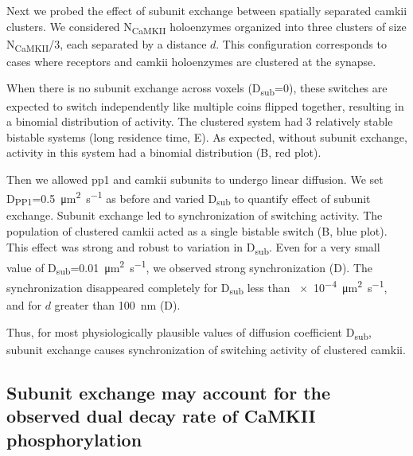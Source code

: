 \documentclass[9pt,lineno,doublespacing]{elife}
\newcommand\SUB[2]{#1\textsubscript{#2}}
\begin{document}
Next we probed the effect of subunit exchange between spatially separated
\gls{camkii} clusters. We considered \SUB{N}{CaMKII} holoenzymes organized into
three clusters of size \SUB{N}{CaMKII}/3, each separated by a distance \(d\).
This configuration corresponds to cases where receptors and \gls{camkii}
holoenzymes are clustered at the synapse. 

When there is no subunit exchange across voxels (\SUB{D}{sub}=0), these switches
are expected to switch independently like multiple coins flipped together,
resulting in a binomial distribution of activity. The clustered system had 3
relatively stable bistable systems (long residence time, E). As
expected, without subunit exchange, activity in this system had a binomial
distribution (B, red plot). 

Then we allowed \gls{pp1} and \gls{camkii} subunits to undergo linear diffusion.
We set \SUB{D}{PP1}=\SI{0.5}{\micro\meter\squared\per\second} as before and
varied \SUB{D}{sub} to quantify effect of subunit exchange. Subunit exchange led
to synchronization of switching activity. The population of clustered
\gls{camkii} acted as a single bistable switch (B, blue plot).
This effect was strong and robust to variation in \SUB{D}{sub}. Even for a very
small value of \SUB{D}{sub}=\SI{0.01}{\micro\meter\squared\per\second}, we
observed strong synchronization (D). The synchronization
disappeared completely for \SUB{D}{sub} less than
\SI{e-4}{\micro\meter\squared\per\second}, and for $d$ greater than
\SI{100}{\nano\meter} (D).

Thus, for most physiologically plausible values of diffusion coefficient
\SUB{D}{sub}, subunit exchange causes synchronization of switching activity of
clustered \gls{camkii}.

\subsection{Subunit exchange may account for the observed dual decay rate of
    CaMKII phosphorylation}\label{subsec:camkii_decay_two_time_course}
\end{document}
